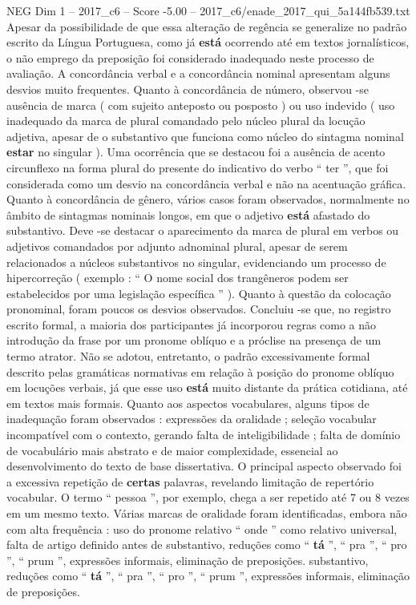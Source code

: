 \begin{textsample}{NEG Dim 1 – 2017\_c6 – Score -5.00 – 2017\_c6/enade\_2017\_qui\_5a144fb539.txt}
Apesar da possibilidade de que essa alteração de regência se generalize no padrão escrito da Língua Portuguesa, como já \textbf{está} ocorrendo até em textos jornalísticos, o não emprego da preposição foi considerado inadequado neste processo de avaliação.
A concordância verbal e a concordância nominal apresentam alguns desvios muito frequentes.
Quanto à concordância de número, observou -se ausência de marca ( com sujeito anteposto ou posposto ) ou uso indevido ( uso inadequado da marca de plural comandado pelo núcleo plural da locução adjetiva, apesar de o substantivo que funciona como núcleo do sintagma nominal \textbf{estar} no singular ).
Uma ocorrência que se destacou foi a ausência de acento circunflexo na forma plural do presente do indicativo do verbo “ ter ”, que foi considerada como um desvio na concordância verbal e não na acentuação gráfica.
Quanto à concordância de gênero, vários casos foram observados, normalmente no âmbito de sintagmas nominais longos, em que o adjetivo \textbf{está} afastado do substantivo.
Deve -se destacar o aparecimento da marca de plural em verbos ou adjetivos comandados por adjunto adnominal plural, apesar de serem relacionados a núcleos substantivos no singular, evidenciando um processo de hipercorreção ( exemplo : “ O nome social dos trangêneros podem ser estabelecidos por uma legislação específica ” ).
Quanto à questão da colocação pronominal, foram poucos os desvios observados.
Concluiu -se que, no registro escrito formal, a maioria dos participantes já incorporou regras como a não introdução da frase por um pronome oblíquo e a próclise na presença de um termo atrator.
Não se adotou, entretanto, o padrão excessivamente formal descrito pelas gramáticas normativas em relação à posição do pronome oblíquo em locuções verbais, já que esse uso \textbf{está} muito distante da prática cotidiana, até em textos mais formais.
Quanto aos aspectos vocabulares, alguns tipos de inadequação foram observados : expressões da oralidade ; seleção vocabular incompatível com o contexto, gerando falta de inteligibilidade ; falta de domínio de vocabulário mais abstrato e de maior complexidade, essencial ao desenvolvimento do texto de base dissertativa.
O principal aspecto observado foi a excessiva repetição de \textbf{certas} palavras, revelando limitação de repertório vocabular.
O termo “ pessoa ”, por exemplo, chega a ser repetido até 7 ou 8 vezes em um mesmo texto.
Várias marcas de oralidade foram identificadas, embora não com alta frequência : uso do pronome relativo “ onde ” como relativo universal, falta de artigo definido antes de substantivo, reduções como “ \textbf{tá} ”, “ pra ”, “ pro ”, “ prum ”, expressões informais, eliminação de preposições. substantivo, reduções como “ \textbf{tá} ”, “ pra ”, “ pro ”, “ prum ”, expressões informais, eliminação de preposições.

\end{textsample}
